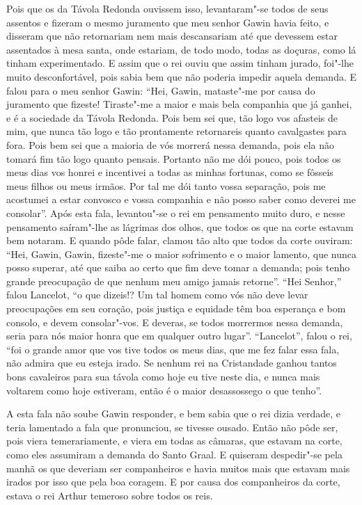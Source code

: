 Pois que os da Távola Redonda ouvissem isso, levantaram"-se todos de seus
assentos e fizeram o mesmo juramento que meu senhor Gawin havia feito, e
disseram que não retornariam nem mais descansariam até que devessem estar
assentados à mesa santa, onde estariam, de todo modo, todas as doçuras, como lá
tinham experimentado. E assim que o rei ouviu que assim tinham jurado, foi"-lhe
muito desconfortável, pois sabia bem que não poderia impedir aquela demanda. E
falou para o meu senhor Gawin: “Hei, Gawin, mataste"-me por causa do juramento
que fizeste! Tiraste"-me a maior e mais bela companhia que já ganhei, e é a
sociedade da Távola Redonda. Pois bem sei que, tão logo vos afasteis de mim,
que nunca tão logo e tão prontamente retornareis quanto cavalgastes para fora.
Pois bem sei que a maioria de vós morrerá nessa demanda, pois ela não tomará
fim tão logo quanto pensais. Portanto não me dói pouco, pois todos os
meus dias vos honrei e incentivei a todas as minhas fortunas, como se fôsseis
meus filhos ou meus irmãos. Por tal me dói tanto vossa separação, pois me
acostumei a estar convosco e vossa companhia e não posso saber como deverei me
consolar”. Após esta fala, levantou"-se o rei em pensamento muito duro,
e nesse pensamento saíram"-lhe as lágrimas dos olhos, que todos os que na corte
estavam bem notaram. E quando pôde falar, clamou tão alto que todos da corte
ouviram: “Hei, Gawin, Gawin, fizeste"-me o maior sofrimento e o maior lamento,
que nunca posso superar, até que saiba ao certo que fim deve tomar a demanda;
pois tenho grande preocupação de que nenhum meu amigo jamais retorne”. “Hei
Senhor,” falou Lancelot, “o que dizeis!? Um tal homem como vós não deve levar
preocupações em seu coração, pois justiça e equidade têm boa esperança e bom
consolo, e devem consolar"-vos. E deveras, se todos morrermos nessa demanda,
seria para nós maior honra que em qualquer outro lugar”. “Lancelot”, falou o
rei, “foi o grande amor que vos tive todos os meus dias, que me fez falar essa
fala, não admira que eu esteja irado. Se nenhum rei na Cristandade ganhou
tantos bons cavaleiros para sua távola como hoje eu tive neste dia, e nunca
mais voltarem como hoje estiveram, então é o maior desassossego o que tenho”. 

A esta fala não soube Gawin responder, e bem sabia que o rei dizia verdade, e
teria lamentado a fala que pronunciou, se tivesse ousado. Então não pôde ser,
pois viera temerariamente, e viera em todas as câmaras, que estavam na corte,
como eles assumiram a demanda do Santo Graal. E quiseram despedir"-se pela manhã
os que deveriam ser companheiros e havia muitos mais que estavam mais irados
por isso que pela boa coragem. E por causa dos companheiros da corte, estava o
rei Arthur temeroso sobre todos os reis. 

